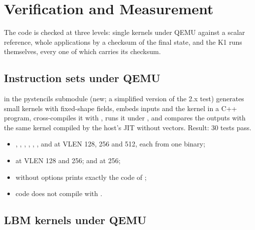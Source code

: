 \chapter{Verification and Measurement}\label{r04:ch:verification}

The code is checked at three levels: single kernels under QEMU against a scalar
reference, whole applications by a checksum of the final state, and the K1 runs
themselves, every one of which carries its checksum.

\section{Instruction sets under QEMU}\label{r04:sec:qemu}

 in the pystencils submodule (new; a simplified version of
the 2.x test) generates small kernels with fixed-shape fields, embeds inputs and the
kernel in a C++ program, cross-compiles it with , runs it
under , and compares the outputs with the
same kernel compiled by the host's JIT without vectors. Result: 30 tests pass.
\begin{itemize}
  \item {}, , , , , ,
     and  at VLEN 128, 256 and 512, each from one
     binary;
  \item {} at VLEN 128 and 256;  and
     at 256;
  \item {} without options prints exactly the code of ;
  \item {} code does not compile with .
\end{itemize}

\section{LBM kernels under QEMU}


